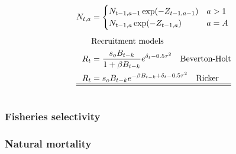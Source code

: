 \begin{tablehere}
\begin{align}
        N_{t,a}&=\begin{cases}
            N_{t-1,a-1} \exp(-Z_{t-1,a-1}) &a>1\\
            N_{t-1,a} \exp(-Z_{t-1,a}) & a=A
        \end{cases}\label{T4.11}\\[1ex]
        &\mbox{Recruitment models} \nonumber\\
        R_t &= \frac{s_oB_{t-k}}{1+\beta B_{t-k}}e^{\delta_{t}-0.5\tau^2} \quad \mbox{Beverton-Holt} \label{T4.12}\\
        R_t &= s_oB_{t-k}e^{-\beta B_{t-k}+\delta_t-0.5\tau^2} \quad \mbox{Ricker} \label{T4.13}\\
        \hline \hline \nonumber
    \end{align}

    \normalEq
\end{tablehere}



\subsubsection{Fisheries selectivity} %
\label{ssub:fisheries_selectivity}


\subsubsection{Natural mortality} %
\label{ssub:natural_mortality}

